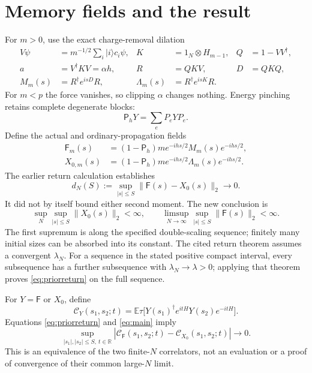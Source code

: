 \documentclass[11pt,a4paper]{article}
\newcommand{\EE}{\mathbb E}
\newcommand{\PP}{\mathsf P_h}
\newcommand{\FF}{\mathsf F}
\begin{document}
\newpage
\section{Memory fields and the result}
For $m>0$, use the exact charge-removal dilation
\begin{align}
 V\psi&=m^{-1/2}\sum_i|i\rangle c_i\psi,&
 K&=1_N\otimes H_{m-1},&Q&=1-VV^\dagger,\\
 a&=V^\dagger KV=\alpha h,&R&=QKV,&D&=QKQ,\\
 M_m(s)&=R^\dagger e^{isD}R,&
 \Lambda_m(s)&=R^\dagger e^{isK}R.
\end{align}
For $m<p$ the force vanishes, so clipping $\alpha$ changes nothing.
Energy pinching retains complete degenerate blocks:
\begin{equation}
 \PP Y=\sum_eP_eYP_e.
\end{equation}
Define the actual and ordinary-propagation fields
\begin{align}
 \FF_m(s)&=(1-\PP)m e^{-ihs/2}M_m(s)e^{-ihs/2},\\
 X_{0,m}(s)&=(1-\PP)m e^{-ihs/2}\Lambda_m(s)e^{-ihs/2}.
\end{align}
The earlier return calculation \cite{Return} establishes
\begin{equation}
 d_N(S):=\sup_{|s|\le S}\|\FF(s)-X_0(s)\|_2\longrightarrow0.
 \label{eq:priorreturn}
\end{equation}
It did not by itself bound either second moment. The new conclusion is
\begin{equation}
 \boxed{\quad
 \sup_N\sup_{|s|\le S}\|X_0(s)\|_2<\infty,\qquad
 \limsup_{N\to\infty}\sup_{|s|\le S}\|\FF(s)\|_2<\infty.
 \quad}
 \label{eq:main}
\end{equation}
The first supremum is along the specified double-scaling sequence;
finitely many initial sizes can be absorbed into its constant.
The cited return theorem assumes a convergent $\lambda_N$.
For a sequence in the stated positive compact interval, every
subsequence has a further subsequence with $\lambda_N\to\lambda>0$;
applying that theorem proves \eqref{eq:priorreturn} on the full sequence.

For $Y=\FF$ or $X_0$, define
\begin{equation}
 \mathcal C_Y(s_1,s_2;t)
 =\EE\tau\big[Y(s_1)^\dagger e^{itH}Y(s_2)e^{-itH}\big].
\end{equation}
Equations \eqref{eq:priorreturn} and \eqref{eq:main} imply
\begin{equation}
 \sup_{|s_1|,|s_2|\le S,\ t\in\mathbb R}
 |\mathcal C_{\FF}(s_1,s_2;t)-\mathcal C_{X_0}(s_1,s_2;t)|\to0.
 \label{eq:cov}
\end{equation}
This is an equivalence of the two finite-$N$ correlators, not an
evaluation or a proof of convergence of their common large-$N$ limit.
\end{document}
